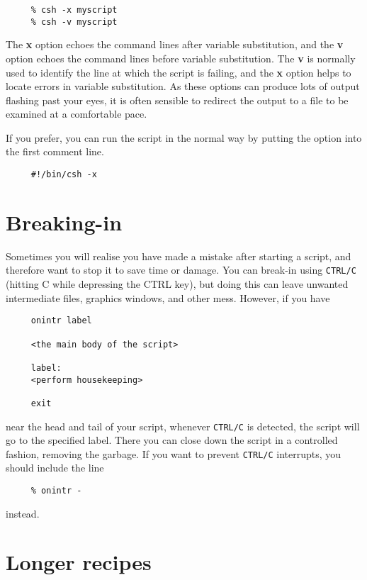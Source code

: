 \documentclass[twoside,11pt]{article}
\newcommand{\xlabel}[1]{}
\begin{document}
\small
\begin{verbatim}
     % csh -x myscript
     % csh -v myscript
\end{verbatim}
\normalsize
The {\bf x} option echoes the command lines after variable substitution,
and the {\bf v} option echoes the command lines before variable
substitution.  The {\bf v} is normally used to identify the line at
which the script is failing, and the {\bf x} option helps to locate
errors in variable substitution.  As these options can produce lots of
output flashing past your eyes, it is often sensible to redirect the
output to a file to be examined at a comfortable pace.

If you prefer, you can run the script in the normal way by putting the
option into the first comment line.

\small
\begin{verbatim}
     #!/bin/csh -x
\end{verbatim}
\normalsize

\section{\xlabel{sc4_se_break_in}Breaking-in
\label{sc4_se_break_in}}

Sometimes you will realise you have made a mistake after starting a
script, and therefore want to stop it to save time or damage.  You can
break-in using {\tt CTRL/C} (hitting C while depressing the CTRL key),
but doing this can leave unwanted intermediate files, graphics
windows, and other mess.  However, if you have

\small
\begin{verbatim}
     onintr label

     <the main body of the script>

     label:
     <perform housekeeping>

     exit
\end{verbatim}
\normalsize
near the head and tail of your script, whenever {\tt CTRL/C} is
detected, the script will go to the specified label.  There you can
close down the script in a controlled fashion, removing the garbage.  If
you want to prevent {\tt CTRL/C} interrupts, you should include the line

\small
\begin{verbatim}
     % onintr -
\end{verbatim}
\normalsize
instead.

\newpage
\section{\xlabel{sc4_se_long_recipes}Longer recipes
\label{sc4_se_long_recipes}}
\end{document}
